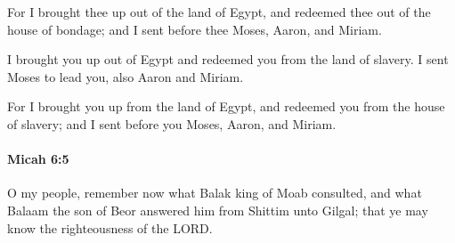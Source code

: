			\begin{versebox}
					\item[BHS] 
					\item[LXX] 
					\item[ASV] For I brought thee up out of the land of Egypt, and redeemed thee out of the house of bondage; and I sent before thee Moses, Aaron, and Miriam.
					\item[NIV] I brought you up out of Egypt and redeemed you from the land of slavery. I sent Moses to lead you, also Aaron and Miriam.
					\item[NRSV] For I brought you up from the land of Egypt, and redeemed you from the house of slavery; and I sent before you Moses, Aaron, and Miriam.
			\end{versebox}

		\paragraph{Micah 6:5} %
			\label{MICAH-6-5}

			O my people, remember now what Balak king of Moab consulted, and what Balaam the son of Beor answered him from Shittim unto Gilgal; that ye may know the righteousness of the LORD.

